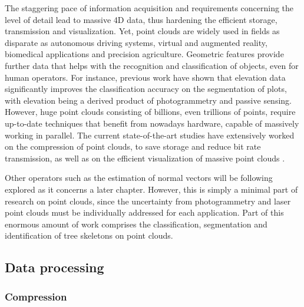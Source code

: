 The staggering pace of information acquisition and requirements concerning the level of detail lead to massive 4D data, thus hardening the efficient storage, transmission and visualization. Yet, point clouds are widely used in fields as disparate as autonomous driving systems, virtual and augmented reality, biomedical applications and precision agriculture. Geometric features provide further data that helps with the recognition and classification of objects, even for human operators. For instance, previous work \cite{barros_multispectral_2022, kerkech_vine_2020, de_castro_3-d_2018} have shown that elevation data significantly improves the classification accuracy on the segmentation of plots, with elevation being a derived product of photogrammetry and passive sensing. However, huge point clouds consisting of billions, even trillions of points, require up-to-date techniques that benefit from nowadays hardware, capable of massively working in parallel. The current state-of-the-art studies have extensively worked on the compression of point clouds, to save storage and reduce bit rate transmission, as well as on the efficient visualization of massive point clouds \cite{schutz_gpu-accelerated_2023, van_oosterom_organizing_2022}. 

Other operators such as the estimation of normal vectors will be following explored as it concerns a later chapter. However, this is simply a minimal part of research on point clouds, since the uncertainty from photogrammetry and laser point clouds must be individually addressed for each application. Part of this enormous amount of work comprises the classification, segmentation and identification of tree skeletons \cite{cardenas_reconstruction_2022} on point clouds. 

\subsection{Data processing}

\subsubsection{Compression}

